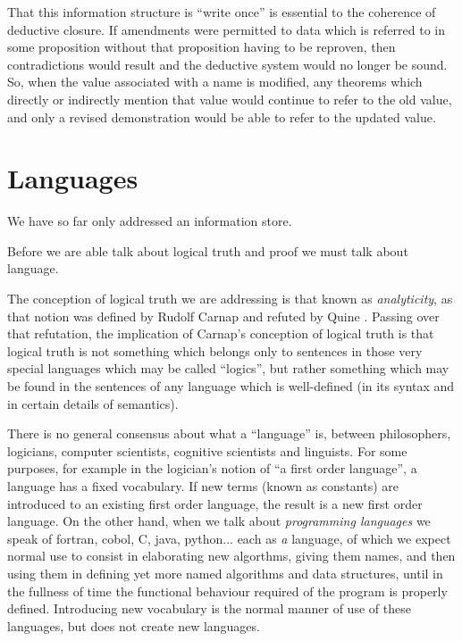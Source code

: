 \documentclass[10pt,titlepage]{article}
\begin{document}
That this information structure is ``write once'' is essential to the coherence of deductive closure.
If amendments were permitted to data which is referred to in some proposition without that proposition having to be reproven, then contradictions would result and the deductive system would no longer be sound.
So, when the value associated with a name is modified, any theorems which directly or indirectly mention that value would continue to refer to the old value, and only a revised demonstration would be able to refer to the updated value.

\section{Languages}

We have so far only addressed an information store.

Before we are able talk about logical truth and proof we must talk about language.

The conception of logical truth we are addressing is that known as \emph{analyticity}, as that notion was defined by Rudolf Carnap \cite{carnap47,schilpp63} and refuted by Quine \cite{quine51b,quine61a}.
Passing over that refutation, the implication of Carnap's conception of logical truth  is that logical truth is not something which belongs only to sentences in those very special languages which may be called ``logics'', but rather something which may be found in the sentences of any language which is well-defined (in its syntax and in certain details of semantics).

There is no general consensus about what a ``language'' is, between philosophers, logicians, computer scientists, cognitive scientists and linguists.
For some purposes, for example in the logician's notion of ``a first order language'', a language has a fixed vocabulary.
If new terms (known as constants) are introduced to an existing first order language, the result is a new first order language.
On the other hand, when we talk about \emph{programming languages} we speak of fortran, cobol, C, java, python... each as \emph{a} language, of which we expect normal use to consist in elaborating new algorthms, giving them names, and then using them in defining yet more named  algorithms and data structures, until in the fullness of time the functional behaviour required of the program is properly defined.
Introducing new vocabulary is the normal manner of use of these languages, but does not create new languages.
\end{document}
